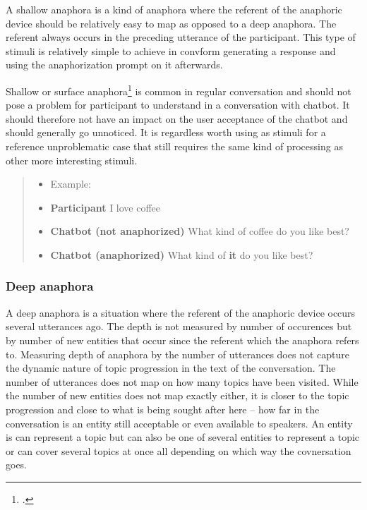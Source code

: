 \documentclass[12pt]{report}
\newcommand{\utterance}[3]{%
    \textbf{#1} #2%
    \ifx\relax#3\relax%
    \else \\ \textit{#3}%
    \fi%
}
\begin{document}
{A shallow anaphora is a kind of anaphora
where the referent of the anaphoric device
should be relatively easy to map
as opposed to a deep anaphora.
The referent always occurs
in the preceding utterance of the participant.
This type of stimuli is relatively simple to achieve
in convform
generating a response
and using the anaphorization prompt on it afterwards.

Shallow or surface anaphora\footcite{hoji2003surface} is common in regular conversation
and should not pose a problem for participant to understand
in a conversation with chatbot.
It should therefore not have an impact
on the user acceptance of the chatbot
and should generally go unnoticed.
It is regardless worth using as stimuli
for a reference unproblematic case
that still requires the same kind of processing
as other more interesting stimuli.

\begin{quote}
\begin{itemize}[label={}, leftmargin=0pt, itemsep=0.5em]
\item Example:
\item \utterance{Participant}{I love coffee}{}
\item \utterance{Chatbot (not anaphorized)}{What kind of coffee do you like best?}{}
\item \utterance{Chatbot (anaphorized)} {What kind of \textbf{it} do you like best?}{}
\end{itemize}
\end{quote}

\subsubsection{Deep anaphora}

A deep anaphora is a situation
where the referent of the anaphoric device
occurs several utterances ago.
The depth is not measured by number of occurences
but by number of new entities that occur
since the referent which the anaphora refers to.
Measuring depth of anaphora by the number of utterances
does not capture the dynamic nature
of topic progression in the text of the conversation.
The number of utterances does not map
on how many topics have been visited.
While the number of new entities does not
map exactly either,
it is closer to the topic progression
and close to
what is being sought after here –
how far in the conversation is an entity
still acceptable or even available to speakers.
An entity is can represent a topic
but can also be one of several entities to represent a topic
or can cover several topics at once
all depending on which way the covnersation goes.

}
\end{document}
